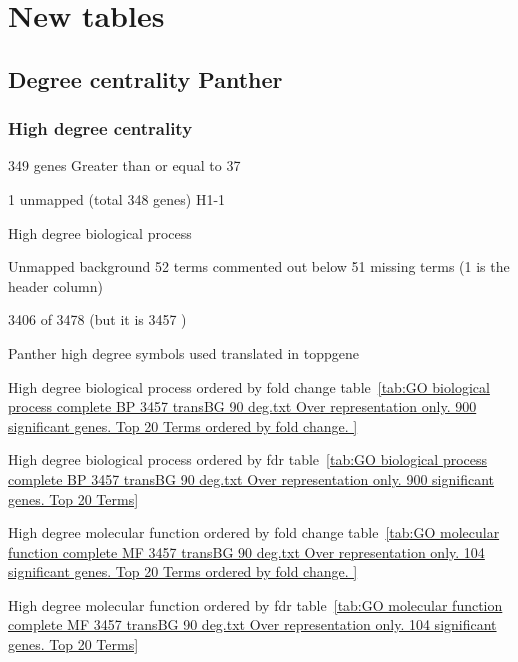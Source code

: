 \chapter{New tables}



\section{Degree centrality Panther}

\subsection{High degree centrality}
349 genes Greater than or equal to 37 

1 unmapped (total 348 genes) H1-1




High degree biological process

Unmapped background 52 terms commented out below 51 missing terms (1 is the header column)

3406 of 3478 (but it is 3457 )





Panther high degree symbols used translated in toppgene

High degree biological process 
ordered by fold change table~\ref{tab:GO biological process complete BP 3457 transBG 90 deg.txt Over representation only. 900 significant genes. Top 20 Terms ordered by fold change. }


High degree biological process
ordered by fdr table~\ref{tab:GO biological process complete BP 3457 transBG 90 deg.txt Over representation only. 900 significant genes. Top 20 Terms}

High degree molecular function 
ordered by fold change table~\ref{tab:GO molecular function complete MF 3457 transBG 90 deg.txt Over representation only. 104 significant genes. Top 20 Terms ordered by fold change. }

High degree molecular function ordered by fdr table~\ref{tab:GO molecular function complete MF 3457 transBG 90 deg.txt Over representation only. 104 significant genes. Top 20 Terms}

